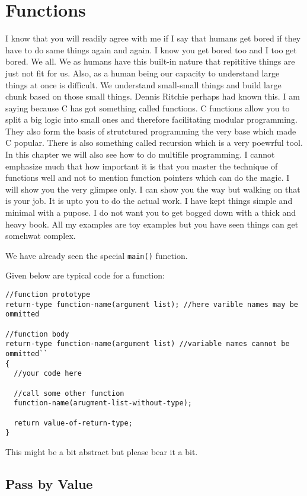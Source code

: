 \chapter{Functions}
I know that you will readily agree with me if I say that humans get bored if
they have to do same things again and again. I know you get bored too and I too
get bored. We all. We as humans have this built-in nature that repititive
things are just not fit for us. Also, as a human being our capacity to
understand large things at once is difficult. We understand small-small things
and build large chunk based on those small things. Dennis Ritchie perhaps had
known this. I am saying because C has got something called functions. C
functions allow you to split a big logic into small ones and therefore
facilitating modular programming. They also form the basis of strutctured
programming the very base which made C popular. There is also something called
recursion which is a very poewrful tool. In this chapter we will also see how
to do multifile programming. I cannot emphasize much that how important it is
that you master the technique of functions well and not to mention function
pointers which can do the magic. I will show you the very glimpse only. I can
show you the way but walking on that is your job. It is upto you to do the
actual work. I have kept things simple and minimal with a pupose. I do not want
you to get bogged down with a thick and heavy book. All my examples are toy
examples but you have seen things can get somehwat complex.

We have already seen the special \texttt{main()} function.

Given below are typical code for a function:

\begin{Verbatim}[frame=single]
//function prototype
return-type function-name(argument list); //here varible names may be ommitted

//function body
return-type function-name(argument list) //variable names cannot be ommitted``
{
  //your code here

  //call some other function
  function-name(arugment-list-without-type);

  return value-of-return-type;
}
\end{Verbatim}
This might be a bit abstract but please bear it a bit.

\section{Pass by Value}

